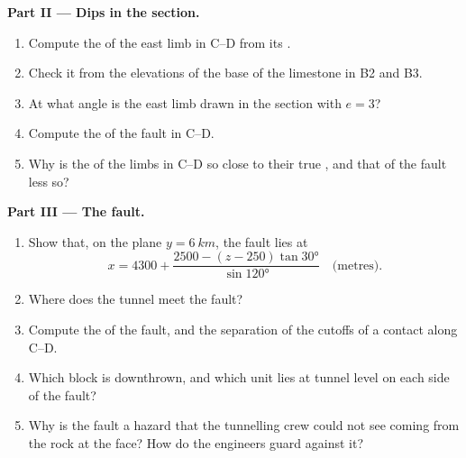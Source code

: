 \begin{problem}
\medskip
\noindent\textbf{Part II --- Dips in the section.}
\begin{enumerate}[resume]
  \item Compute the  of the east limb in C--D from its .
  \item Check it from the elevations of the base of the limestone in B2 and
        B3.
  \item At what angle is the east limb drawn in the section with $e = 3$?
  \item Compute the  of the fault in C--D.
  \item Why is the  of the limbs in C--D so close to their true
        , and that of the fault less so?
\end{enumerate}

\medskip
\noindent\textbf{Part III --- The fault.}
\begin{enumerate}[resume]
  \item Show that, on the plane $y = \qty{6}{km}$, the fault lies at
        \[ x = 4300 + \frac{2500 - (z - 250)\tan\ang{30}}{\sin\ang{120}}
           \quad\text{(metres)}. \]
  \item Where does the tunnel meet the fault?
  \item Compute the  of the fault, and the separation of the cutoffs of
        a contact along C--D.
  \item Which block is downthrown, and which unit lies at tunnel level on each
        side of the fault?
  \item Why is the fault a hazard that the tunnelling crew could not see
        coming from the rock at the face? How do the engineers guard against
        it?
\end{enumerate}


\end{problem}

